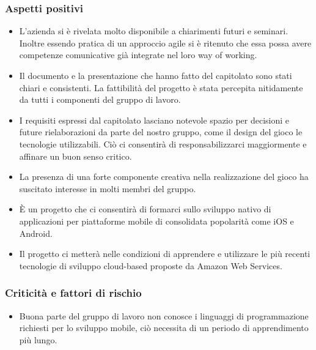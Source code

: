 		\subsubsection{Aspetti positivi}
			\begin{itemize}
				\item L’azienda si è rivelata molto disponibile a chiarimenti futuri e seminari. Inoltre essendo pratica di un approccio agile si è ritenuto che essa possa avere competenze comunicative già integrate nel loro way of working.
				\item Il documento e la presentazione che hanno fatto del capitolato sono stati chiari e consistenti. La fattibilità del progetto è stata percepita nitidamente da tutti i componenti del gruppo di lavoro.
				\item I requisiti espressi dal capitolato lasciano notevole spazio per decisioni e future rielaborazioni da parte del nostro gruppo, come il design del gioco le tecnologie utilizzabili. Ciò ci consentirà di responsabilizzarci maggiormente e affinare un buon senso critico.
				\item La presenza di una forte componente creativa nella realizzazione del gioco ha suscitato interesse in molti membri del gruppo.
				\item È un progetto che ci consentirà di formarci sullo sviluppo nativo di applicazioni per piattaforme mobile di consolidata popolarità come iOS e Android.
				\item Il progetto ci metterà nelle condizioni di apprendere e utilizzare le più recenti tecnologie di sviluppo cloud-based proposte da Amazon Web Services.
			\end{itemize}
			
		\subsubsection{Criticità e fattori di rischio}
			\begin{itemize}
				\item Buona parte del gruppo di lavoro non conosce i linguaggi di programmazione richiesti per lo sviluppo mobile, ciò necessita di un periodo di apprendimento più lungo.
			\end{itemize}
				
				
				
				
				
				
				
				
				
				
				
				
				
				
				
				
				
				
				
				
				
				
				
				
				
				
				
				
				
				
				